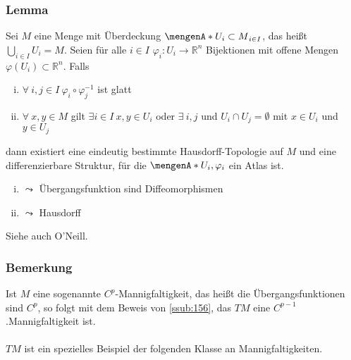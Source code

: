 \subsubsection{Lemma}
\label{ssub:134}
Sei $M$ eine Menge mit Überdeckung $\set{U_i\subset M}_{i\in I}$, das heißt $\bigcup_{i\in I} U_i = M$. Seien für alle $i\in I$ $\varphi_i:U_i\to \mathds{R}^n$ Bijektionen mit offene Mengen $\varphi(U_i)\subset \mathds{R}^n$. Falls
\begin{enumerate}[(i)]
\item $\forall\ i,j\in I\ \varphi_i \circ \varphi_j^{-1}$ ist glatt
\item $\forall\ x,y\in M$ gilt $\exists i\in I\ x,y\in U_i$ oder $\exists\ i,j$ und $U_i\cap U_j = \emptyset$ mit $x\in U_i$ und $y\in U_j$
\end{enumerate}
dann existiert eine eindeutig bestimmte Hausdorff-Topologie auf $M$ und eine differenzierbare Struktur, für die $\set{U_i,\varphi_i}$ ein Atlas ist.
\begin{enumerate}[(i)]
\item $\leadsto$ Übergangsfunktion sind Diffeomorphismen
\item $\leadsto$ Hausdorff
\end{enumerate}
Siehe auch O'Neill.

\subsubsection{Bemerkung}
\label{ssub:135}
Ist $M$ eine sogenannte $C^p$-Mannigfaltigkeit, das heißt die Übergangsfunktionen sind $C^p$, so folgt mit dem Beweis von \ref{ssub:156}, das $TM$ eine $C^{p-1}$.Mannigfaltigkeit ist.\\
\\
$TM$ ist ein spezielles Beispiel der folgenden Klasse an Mannigfaltigkeiten.

